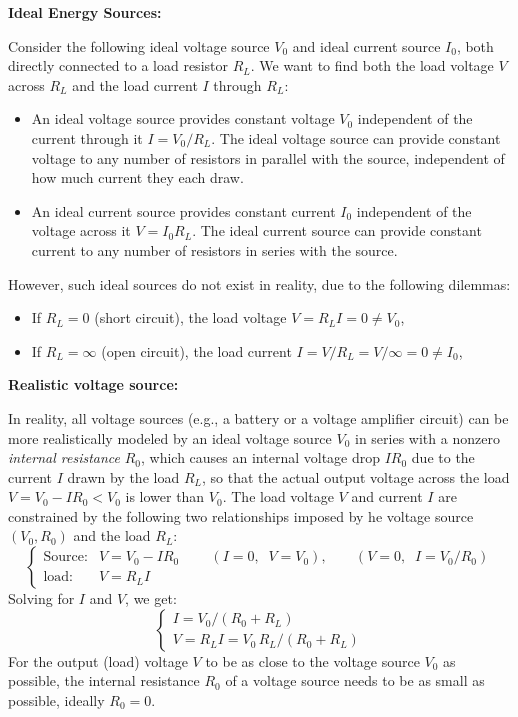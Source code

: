 \documentclass{article}
\begin{document}
{\bf Ideal Energy Sources:}

Consider the following ideal voltage source $V_0$ and ideal current 
source $I_0$, both directly connected to a load resistor $R_L$. We want
to find both the load voltage $V$ across $R_L$ and the load current $I$
through $R_L$:

\begin{itemize}
\item An ideal voltage source provides constant voltage $V_0$ independent 
  of the current through it $I=V_0/R_L$. The ideal voltage source can
  provide constant voltage to any number of resistors in parallel with 
  the source, independent of how much current they each draw.

\item An ideal current source provides constant current $I_0$ independent 
  of the voltage across it $V=I_0 R_L$. The ideal current source can 
  provide constant current to any number of resistors in series with 
  the source.
\end{itemize}

However, such ideal sources do not exist in reality, due to the following
dilemmas:
\begin{itemize}
\item If $R_L=0$ (short circuit), the load voltage $V=R_L I=0\ne V_0$,
\item If $R_L=\infty$ (open circuit), the load current $I=V/R_L=V/\infty=0\ne I_0$,
\end{itemize}

{\bf Realistic voltage source:} 

In reality, all voltage sources (e.g., a battery or a voltage amplifier 
circuit) can be more realistically modeled by an ideal voltage source $V_0$ 
in series with a nonzero {\em internal resistance} $R_0$, which causes an
internal voltage drop $IR_0$ due to the current $I$ drawn by the load $R_L$, 
so that the actual output voltage across the load $V=V_0-IR_0< V_0$ is lower 
than $V_0$. The load voltage $V$ and current $I$ are constrained by the 
following two relationships imposed by he voltage source $(V_0, R_0)$ and 
the load $R_L$:
\begin{equation} 
  \left\{ \begin{array}{lll}
    \mbox{Source:} &  V=V_0-IR_0\;\;\;\;\;\;\;\;
    (I=0,\;\;V=V_0),\;\;\;\;\;\;\;(V=0,\;\;I=V_0/R_0)\\ 
    \mbox{load:} & V=R_LI \end{array} \right.
\end{equation}
Solving for $I$ and $V$, we get:
\begin{equation} 
  \left\{ \begin{array}{l}
    I=V_0/(R_0+R_L) \\ V=R_L I=V_0\,R_L/(R_0+R_L) 
  \end{array} \right. 
\end{equation}
For the output (load) voltage $V$ to be as close to the voltage source $V_0$
as possible, the internal resistance $R_0$ of a voltage source needs to be as 
small as possible, ideally $R_0=0$.
\end{document}
